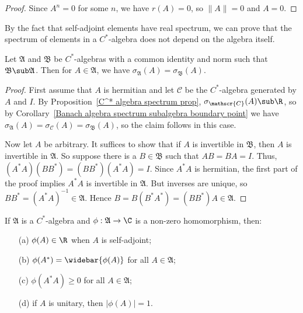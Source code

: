 \begin{proof}
Since $A^n=0$ for some $n$, we have $r(A)=0$, so $\|A\|=0$ and $A=0$.
\end{proof}
By the fact that self-adjoint elements have real spectrum, we can prove that the spectrum of elements in a $C^*$-algebra does not depend on the algebra itself.
\begin{proposition}\label{C^* algebra spectrum in subalgebra}
Let $\mathfrak{A}$ and $\mathfrak{B}$ be $C^*$-algebras with a common identity and norm such that $\mathfrak{B}\sub\mathfrak{A}$. Then for $A\in\mathfrak{A}$, we have $\sigma_{\mathfrak{A}}(A)=\sigma_{\mathfrak{B}}(A)$.
\end{proposition}
\begin{proof}
First assume that $A$ is hermitian and let $\mathscr{C}$ be the $C^*$-algebra generated by $A$ and $I$. By Proposition~\ref{C^* algebra spectrum prop}, $\sigma_{\mathscr{C}}(A)\sub\R$, so by Corollary~\ref{Banach algebra spectrum subalgebra boundary point} we have $\sigma_{\mathfrak{A}}(A)=\sigma_{\mathscr{C}}(A)=\sigma_{\mathfrak{B}}(A)$, so the claim follows in this case.\par
Now let $A$ be arbitrary. It suffices to show that if $A$ is invertible in $\mathfrak{B}$, then $A$ is invertible in $\mathfrak{A}$. So suppose there is a $B\in\mathfrak{B}$ such that $AB=BA=I$. Thus, $(A^*A)(BB^*)=(BB^*)(A^*A)=I$. Since $A^*A$ is hermitian, the first part of the proof implies $A^*A$ is invertible in $\mathfrak{A}$. But inverses are unique, so $BB^*=(A^*A)^{-1}\in\mathfrak{A}$. Hence $B=B(B^*A^*)=(BB^*)A\in\mathfrak{A}$.
\end{proof}
\begin{proposition}\label{C^* algebra homomorphism to C prop}
If $\mathfrak{A}$ is a $C^*$-algebra and $\phi:\mathfrak{A}\to\C$ is a non-zero homomorphism, then:
\begin{itemize}
\item[(a)] $\phi(A)\in\R$ when $A$ is self-adjoint;
\item[(b)] $\phi(A^*)=\widebar{\phi(A)}$ for all $A\in\mathfrak{A}$;
\item[(c)] $\phi(A^*A)\geq 0$ for all $A\in\mathfrak{A}$;
\item[(d)] if $A$ is unitary, then $|\phi(A)|=1$.
\end{itemize}
\end{proposition}
